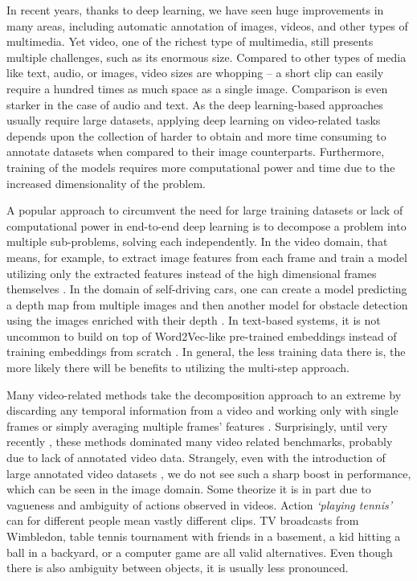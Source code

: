 In recent years, thanks to deep learning, we have seen huge improvements in many areas, including automatic annotation of images, videos, and other types of multimedia. Yet video, one of the richest type of multimedia, still presents multiple challenges, such as its enormous size. Compared to other types of media like text, audio, or images, video sizes are whopping -- a short clip can easily require a hundred times as much space as a single image. Comparison is even starker in the case of audio and text. As the deep learning-based approaches usually require large datasets, applying deep learning on video-related tasks depends upon the collection of harder to obtain and more time consuming to annotate datasets when compared to their image counterparts. Furthermore, training of the models requires more computational power and time due to the increased dimensionality of the problem.

A popular approach to circumvent the need for large training datasets or lack of computational power in end-to-end deep learning is to decompose a problem into multiple sub-problems, solving each independently. In the video domain, that means, for example, to extract image features from each frame and train a model utilizing only the extracted features instead of the high dimensional frames themselves \cite{Miech_2019_ICCV_HowTo100M,XirongW2VVpp}. In the domain of self-driving cars, one can create a model predicting a depth map from multiple images \cite{Yin_2019_CVPR_HD3} and then another model for obstacle detection using the images enriched with their depth \cite{Qi_2018_CVPR_FrustumPointNets}. In text-based systems, it is not uncommon to build on top of Word2Vec-like \cite{word2vec} pre-trained embeddings instead of training embeddings from scratch \cite{Miech_2019_ICCV_HowTo100M,XirongW2VVpp}. In general, the less training data there is, the more likely there will be benefits to utilizing the multi-step approach.

Many video-related methods take the decomposition approach to an extreme by discarding any temporal information from a video and working only with single frames or simply averaging multiple frames' features \cite{Miech_2019_ICCV_HowTo100M,XirongW2VVpp}. Surprisingly, until very recently \cite{Miech_2020_CVPR}, these methods dominated many video related benchmarks, probably due to lack of annotated video data.
Strangely, even with the introduction of large annotated video datasets \cite{Ray_2018_ECCV}, we do not see such a sharp boost in performance, which can be seen in the image domain. Some theorize it is in part due to vagueness and ambiguity of actions observed in videos. Action \textit{`playing tennis'} can for different people mean vastly different clips. TV broadcasts from Wimbledon, table tennis tournament with friends in a basement, a kid hitting a ball in a backyard, or a computer game are all valid alternatives. 
Even though there is also ambiguity between objects, it is usually less pronounced.


